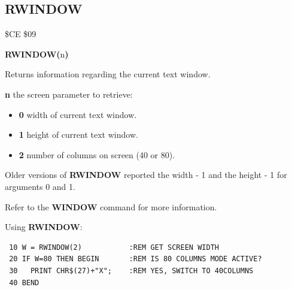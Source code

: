 \subsection{RWINDOW}
\begin{description}[leftmargin=2cm,style=nextline]
\item [Token:] \$CE \$09
\item [Format:] {\bf RWINDOW(}n{\bf)}
\item [Usage:]  Returns information regarding the current text window.

                {\bf n} the screen parameter to retrieve:

                \begin{itemize}
                    \item {\bf 0} width of current text window.
                    \item {\bf 1} height of current text window.
                    \item {\bf 2} number of columns on screen (40 or 80).
                \end{itemize}

\item [Remarks:] Older versions of {\bf RWINDOW} reported
                 the width - 1 and the height - 1 for arguments 0 and 1.

                 Refer to the {\bf WINDOW} command for more information.

\item [Example:] Using {\bf RWINDOW}:
\begin{tcolorbox}[colback=black,coltext=white]
\verbatimfont{\codefont}
\begin{verbatim}
 10 W = RWINDOW(2)           :REM GET SCREEN WIDTH
 20 IF W=80 THEN BEGIN       :REM IS 80 COLUMNS MODE ACTIVE?
 30   PRINT CHR$(27)+"X";    :REM YES, SWITCH TO 40COLUMNS
 40 BEND
\end{verbatim}
\end{tcolorbox}
\end{description}





\newpage
